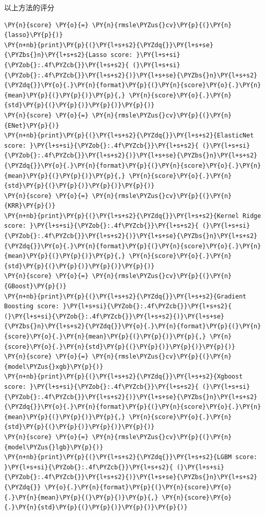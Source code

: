 \documentclass[no-math]{YangThesis}
\begin{document}
以上方法的评分

\begin{tcolorbox}[breakable, size=fbox, boxrule=1pt, pad at break*=1mm,colback=cellbackground, colframe=cellborder]
	\begin{Verbatim}[commandchars=\\\{\}]
\PY{n}{score} \PY{o}{=} \PY{n}{rmsle\PYZus{}cv}\PY{p}{(}\PY{n}{lasso}\PY{p}{)}
\PY{n+nb}{print}\PY{p}{(}\PY{l+s+s2}{\PYZdq{}}\PY{l+s+se}{\PYZbs{}n}\PY{l+s+s2}{Lasso score: }\PY{l+s+si}{\PYZob{}:.4f\PYZcb{}}\PY{l+s+s2}{ (}\PY{l+s+si}{\PYZob{}:.4f\PYZcb{}}\PY{l+s+s2}{)}\PY{l+s+se}{\PYZbs{}n}\PY{l+s+s2}{\PYZdq{}}\PY{o}{.}\PY{n}{format}\PY{p}{(}\PY{n}{score}\PY{o}{.}\PY{n}{mean}\PY{p}{(}\PY{p}{)}\PY{p}{,} \PY{n}{score}\PY{o}{.}\PY{n}{std}\PY{p}{(}\PY{p}{)}\PY{p}{)}\PY{p}{)}
\PY{n}{score} \PY{o}{=} \PY{n}{rmsle\PYZus{}cv}\PY{p}{(}\PY{n}{ENet}\PY{p}{)}
\PY{n+nb}{print}\PY{p}{(}\PY{l+s+s2}{\PYZdq{}}\PY{l+s+s2}{ElasticNet score: }\PY{l+s+si}{\PYZob{}:.4f\PYZcb{}}\PY{l+s+s2}{ (}\PY{l+s+si}{\PYZob{}:.4f\PYZcb{}}\PY{l+s+s2}{)}\PY{l+s+se}{\PYZbs{}n}\PY{l+s+s2}{\PYZdq{}}\PY{o}{.}\PY{n}{format}\PY{p}{(}\PY{n}{score}\PY{o}{.}\PY{n}{mean}\PY{p}{(}\PY{p}{)}\PY{p}{,} \PY{n}{score}\PY{o}{.}\PY{n}{std}\PY{p}{(}\PY{p}{)}\PY{p}{)}\PY{p}{)}
\PY{n}{score} \PY{o}{=} \PY{n}{rmsle\PYZus{}cv}\PY{p}{(}\PY{n}{KRR}\PY{p}{)}
\PY{n+nb}{print}\PY{p}{(}\PY{l+s+s2}{\PYZdq{}}\PY{l+s+s2}{Kernel Ridge score: }\PY{l+s+si}{\PYZob{}:.4f\PYZcb{}}\PY{l+s+s2}{ (}\PY{l+s+si}{\PYZob{}:.4f\PYZcb{}}\PY{l+s+s2}{)}\PY{l+s+se}{\PYZbs{}n}\PY{l+s+s2}{\PYZdq{}}\PY{o}{.}\PY{n}{format}\PY{p}{(}\PY{n}{score}\PY{o}{.}\PY{n}{mean}\PY{p}{(}\PY{p}{)}\PY{p}{,} \PY{n}{score}\PY{o}{.}\PY{n}{std}\PY{p}{(}\PY{p}{)}\PY{p}{)}\PY{p}{)}
\PY{n}{score} \PY{o}{=} \PY{n}{rmsle\PYZus{}cv}\PY{p}{(}\PY{n}{GBoost}\PY{p}{)}
\PY{n+nb}{print}\PY{p}{(}\PY{l+s+s2}{\PYZdq{}}\PY{l+s+s2}{Gradient Boosting score: }\PY{l+s+si}{\PYZob{}:.4f\PYZcb{}}\PY{l+s+s2}{ (}\PY{l+s+si}{\PYZob{}:.4f\PYZcb{}}\PY{l+s+s2}{)}\PY{l+s+se}{\PYZbs{}n}\PY{l+s+s2}{\PYZdq{}}\PY{o}{.}\PY{n}{format}\PY{p}{(}\PY{n}{score}\PY{o}{.}\PY{n}{mean}\PY{p}{(}\PY{p}{)}\PY{p}{,} \PY{n}{score}\PY{o}{.}\PY{n}{std}\PY{p}{(}\PY{p}{)}\PY{p}{)}\PY{p}{)}
\PY{n}{score} \PY{o}{=} \PY{n}{rmsle\PYZus{}cv}\PY{p}{(}\PY{n}{model\PYZus{}xgb}\PY{p}{)}
\PY{n+nb}{print}\PY{p}{(}\PY{l+s+s2}{\PYZdq{}}\PY{l+s+s2}{Xgboost score: }\PY{l+s+si}{\PYZob{}:.4f\PYZcb{}}\PY{l+s+s2}{ (}\PY{l+s+si}{\PYZob{}:.4f\PYZcb{}}\PY{l+s+s2}{)}\PY{l+s+se}{\PYZbs{}n}\PY{l+s+s2}{\PYZdq{}}\PY{o}{.}\PY{n}{format}\PY{p}{(}\PY{n}{score}\PY{o}{.}\PY{n}{mean}\PY{p}{(}\PY{p}{)}\PY{p}{,} \PY{n}{score}\PY{o}{.}\PY{n}{std}\PY{p}{(}\PY{p}{)}\PY{p}{)}\PY{p}{)}
\PY{n}{score} \PY{o}{=} \PY{n}{rmsle\PYZus{}cv}\PY{p}{(}\PY{n}{model\PYZus{}lgb}\PY{p}{)}
\PY{n+nb}{print}\PY{p}{(}\PY{l+s+s2}{\PYZdq{}}\PY{l+s+s2}{LGBM score: }\PY{l+s+si}{\PYZob{}:.4f\PYZcb{}}\PY{l+s+s2}{ (}\PY{l+s+si}{\PYZob{}:.4f\PYZcb{}}\PY{l+s+s2}{)}\PY{l+s+se}{\PYZbs{}n}\PY{l+s+s2}{\PYZdq{}} \PY{o}{.}\PY{n}{format}\PY{p}{(}\PY{n}{score}\PY{o}{.}\PY{n}{mean}\PY{p}{(}\PY{p}{)}\PY{p}{,} \PY{n}{score}\PY{o}{.}\PY{n}{std}\PY{p}{(}\PY{p}{)}\PY{p}{)}\PY{p}{)}
	\end{Verbatim}
\end{tcolorbox}
\end{document}
